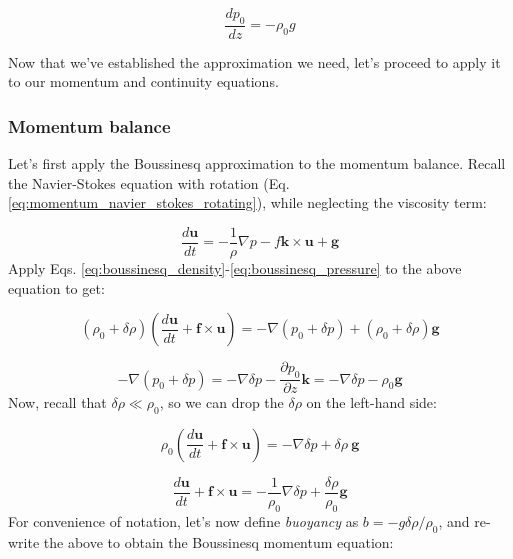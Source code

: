 \documentclass[12pt]{article}
\numberwithin{equation}{section}
\numberwithin{figure}{section}
\numberwithin{table}{section}
\begin{document}
\begin{equation}
  \frac{d p_0}{d z} = - \rho_0 g
  \label{eq:boussinesq_pressure_hydrostatic}
\end{equation}

Now that we've established the approximation we need, let's proceed to apply it
to our momentum and continuity equations.

\subsubsection{Momentum balance}

Let's first apply the Boussinesq approximation to the momentum balance.
Recall the Navier-Stokes equation with rotation
(Eq. \ref{eq:momentum_navier_stokes_rotating}), while neglecting the viscosity
term:

\begin{equation}
  \frac{d \mathbf{u}}{dt} = - \frac{1}{\rho} \nabla p - f \mathbf{k} \times \mathbf{u} + \mathbf{g}
\end{equation}
Apply Eqs. \ref{eq:boussinesq_density}-\ref{eq:boussinesq_pressure} to the
above equation to get:

\begin{equation}
  \left( \rho_0 + \delta \rho \right) \left( \frac{d \mathbf{u}}{dt} + \mathbf{f} \times \mathbf{u} \right) =
  - \nabla \left( p_0 + \delta p \right)
  + \left( \rho_0 + \delta \rho \right) \mathbf{g}
\end{equation}

\begin{equation}
  - \nabla \left( p_0 + \delta p \right) =
  - \nabla \delta p - \frac{\partial p_0}{\partial z} \mathbf{k} = 
  - \nabla \delta p - \rho_0 \mathbf{g}
\end{equation}
Now, recall that $\delta \rho \ll \rho_0$, so we can drop the $\delta \rho$
on the left-hand side:

\begin{equation}
  \rho_0 \left( \frac{d \mathbf{u}}{dt} + \mathbf{f} \times \mathbf{u} \right) =
  - \nabla \delta p + \delta \rho\ \mathbf{g}
\end{equation}

\begin{equation}
  \frac{d \mathbf{u}}{dt} + \mathbf{f} \times \mathbf{u} =
  - \frac{1}{\rho_0} \nabla \delta p + \frac{\delta \rho}{\rho_0} \mathbf{g}
\end{equation}
For convenience of notation, let's now define \textit{buoyancy}
as $b = - g \delta \rho / \rho_0$, and re-write the above to obtain the
Boussinesq momentum equation:
\end{document}
